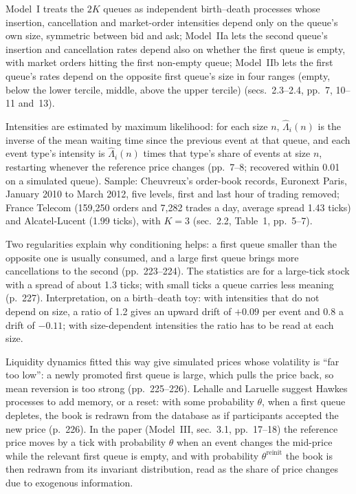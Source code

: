 \begin{qfmodel}
Model~I treats the $2K$ queues as independent birth--death processes whose insertion, cancellation and market-order intensities depend only on the queue's own size, symmetric between bid and ask; Model~IIa lets the second queue's insertion and cancellation rates depend also on whether the first queue is empty, with market orders hitting the first non-empty queue; Model~IIb lets the first queue's rates depend on the opposite first queue's size in four ranges (empty, below the lower tercile, middle, above the upper tercile) (secs.~2.3--2.4, pp.~7, 10--11 and~13).

Intensities are estimated by maximum likelihood: for each size $n$, $\hat\Lambda_i(n)$ is the inverse of the mean waiting time since the previous event at that queue, and each event type's intensity is $\hat\Lambda_i(n)$ times that type's share of events at size $n$, restarting whenever the reference price changes (pp.~7--8; recovered within 0.01 on a simulated queue). Sample: Cheuvreux's order-book records, Euronext Paris, January 2010 to March 2012, five levels, first and last hour of trading removed; France Telecom (159,250 orders and 7,282 trades a day, average spread 1.43 ticks) and Alcatel-Lucent (1.99 ticks), with $K=3$ (sec.~2.2, Table~1, pp.~5--7).

Two regularities explain why conditioning helps: a first queue smaller than the opposite one is usually consumed, and a large first queue brings more cancellations to the second (pp.~223--224). The statistics are for a large-tick stock with a spread of about 1.3 ticks; with small ticks a queue carries less meaning (p.~227). Interpretation, on a birth--death toy: with intensities that do not depend on size, a ratio of 1.2 gives an upward drift of $+0.09$ per event and 0.8 a drift of $-0.11$; with size-dependent intensities the ratio has to be read at each size.

 Liquidity dynamics fitted this way give simulated prices whose volatility is ``far too low'': a newly promoted first queue is large, which pulls the price back, so mean reversion is too strong (pp.~225--226). Lehalle and Laruelle suggest Hawkes processes to add memory, or a reset: with some probability $\theta$, when a first queue depletes, the book is redrawn from the database as if participants accepted the new price (p.~226). In the paper (Model~III, sec.~3.1, pp.~17--18) the reference price moves by a tick with probability $\theta$ when an event changes the mid-price while the relevant first queue is empty, and with probability $\theta^{\text{reinit}}$ the book is then redrawn from its invariant distribution, read as the share of price changes due to exogenous information.


\end{qfmodel}
